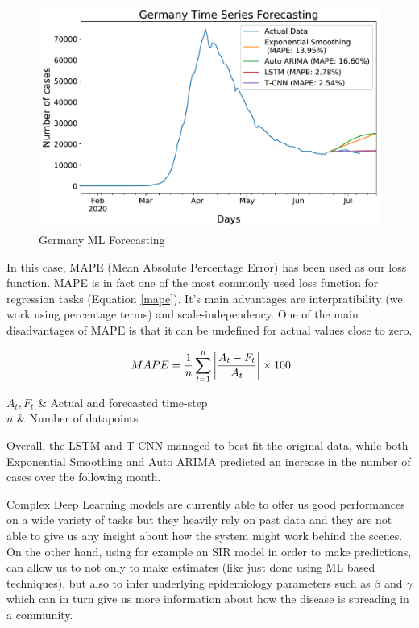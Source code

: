 \vspace{-0.3cm}
\begin{figure}[ht!]%
    \centering
    \includegraphics[width=0.55\linewidth]{latex/images/Germany_darts.pdf}
    \vspace{-0.2cm}
    \caption{Germany ML Forecasting}
    \label{ml_forecast}
\end{figure}
\vspace{-0.4cm}

In this case, MAPE (Mean Absolute Percentage Error) has been used as our loss function. 
MAPE is in fact one of the most commonly used loss function for regression tasks (Equation \ref{mape}). It's main advantages are interpratibility (we work using percentage terms) and scale-independency. One of the main disadvantages of MAPE is that it can be undefined for actual values close to zero.

\useshortskip
\begin{align}
\ MAPE = \dfrac{1}{n} \sum_{t=1}^{n} \abs{\frac{A_{t}-F_{t}}{A_{t}}} \times 100
\label{mape}
\vspace{-1.8cm}
\end{align}
\vspace{-0.5cm}
\begin{conditions}
 $A_{t}, F_{t}$  &  Actual and forecasted time-step \\
 $n$  &  Number of datapoints\\
\end{conditions}
\vspace{-0.2cm}
\useshortskip

Overall, the LSTM and T-CNN managed to best fit the original data, while both Exponential Smoothing and Auto ARIMA predicted an increase in the number of cases over the following month. 

Complex Deep Learning models are currently able to offer us good performances on a wide variety of tasks but they heavily rely on past data and they are not able to give us any insight about how the system might work behind the scenes. On the other hand, using for example an SIR model in order to make predictions, can allow us to not only to make estimates (like just done using ML based techniques), but also to infer underlying epidemiology parameters such as $\beta$ and $\gamma$ which can in turn give us more information about how the disease is spreading in a community.

